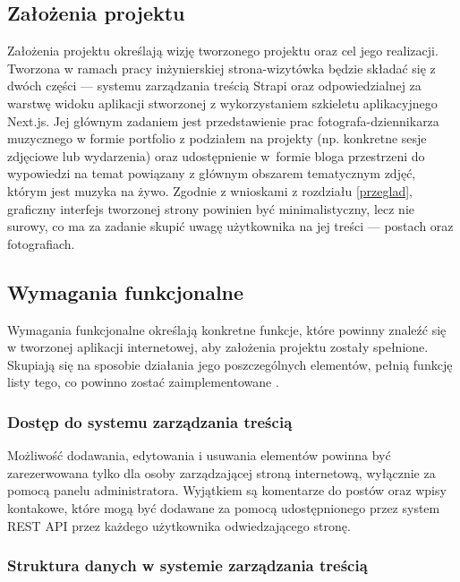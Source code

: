 \documentclass[12pt]{article}
\numberwithin{figure}{section}
\begin{document}
\begin{sloppypar}

\subsection{Założenia projektu}

Założenia projektu określają wizję tworzonego projektu oraz cel jego realizacji. Tworzona w ramach pracy inżynierskiej strona-wizytówka będzie składać się z dwóch części --- systemu zarządzania treścią Strapi oraz odpowiedzialnej za warstwę widoku aplikacji stworzonej z wykorzystaniem szkieletu aplikacyjnego Next.js. Jej głównym zadaniem jest przedstawienie prac fotografa-dziennikarza muzycznego w formie portfolio z podziałem na projekty (np. konkretne sesje zdjęciowe lub wydarzenia) oraz udostępnienie w~formie bloga przestrzeni do wypowiedzi na temat powiązany z głównym obszarem tematycznym zdjęć, którym jest muzyka na żywo. Zgodnie z wnioskami z rozdziału \ref{przeglad}, graficzny interfejs tworzonej strony powinien być minimalistyczny, lecz nie surowy, co ma za zadanie skupić uwagę użytkownika na jej treści --- postach oraz fotografiach. 


\subsection{Wymagania funkcjonalne}

Wymagania funkcjonalne określają konkretne funkcje, które powinny znaleźć się w tworzonej aplikacji internetowej, aby założenia projektu zostały spełnione. Skupiają się na sposobie działania jego poszczególnych elementów, pełnią funkcję listy tego, co powinno zostać zaimplementowane \cite{wymagania}. 

\subsubsection*{Dostęp do systemu zarządzania treścią}

Możliwość dodawania, edytowania i usuwania elementów powinna być zarezerwowana tylko dla osoby zarządzającej stroną internetową, wyłącznie za pomocą panelu administratora. Wyjątkiem są komentarze do postów oraz wpisy kontakowe, które mogą być dodawane za pomocą udostępnionego przez system REST API przez każdego użytkownika odwiedzającego stronę. 

\subsubsection*{Struktura danych w systemie zarządzania treścią} \label{struktura}


\end{sloppypar}
\end{document}
